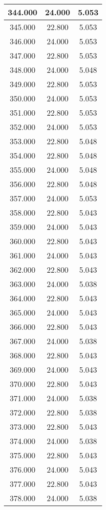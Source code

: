 \documentclass[11pt,a4paper]{jsarticle}
\begin{document}
\begin{center}
\begin{longtable}{|c|c|c|}
344.000	 & 24.000&  5.053 \\ \hline
345.000	 & 22.800&  5.053 \\ \hline
346.000	 & 24.000&  5.053 \\ \hline
347.000	 & 22.800&  5.053 \\ \hline
348.000	 & 24.000&  5.048 \\ \hline
349.000	 & 22.800&  5.053 \\ \hline
350.000	 & 24.000&  5.053 \\ \hline
351.000	 & 22.800&  5.053 \\ \hline
352.000	 & 24.000&  5.053 \\ \hline
353.000	 & 22.800&  5.048 \\ \hline
354.000	 & 22.800&  5.048 \\ \hline
355.000	 & 24.000&  5.048 \\ \hline
356.000	 & 22.800&  5.048 \\ \hline
357.000	 & 24.000&  5.053 \\ \hline
358.000	 & 22.800&  5.043 \\ \hline
359.000	 & 24.000&  5.043 \\ \hline
360.000	 & 22.800&  5.043 \\ \hline
361.000	 & 24.000&  5.043 \\ \hline
362.000	 & 22.800&  5.043 \\ \hline
363.000	 & 24.000&  5.038 \\ \hline
364.000	 & 22.800&  5.043 \\ \hline
365.000	 & 24.000&  5.043 \\ \hline
366.000	 & 22.800&  5.043 \\ \hline
367.000	 & 24.000&  5.038 \\ \hline
368.000	 & 22.800&  5.043 \\ \hline
369.000	 & 24.000&  5.043 \\ \hline
370.000	 & 22.800&  5.043 \\ \hline
371.000	 & 24.000&  5.038 \\ \hline
372.000	 & 22.800&  5.038 \\ \hline
373.000	 & 22.800&  5.043 \\ \hline
374.000	 & 24.000&  5.038 \\ \hline
375.000	 & 22.800&  5.043 \\ \hline
376.000	 & 24.000&  5.043 \\ \hline
377.000	 & 22.800&  5.043 \\ \hline
378.000	 & 24.000&  5.038 \\ \hline

\end{longtable}
\end{center}
\end{document}
